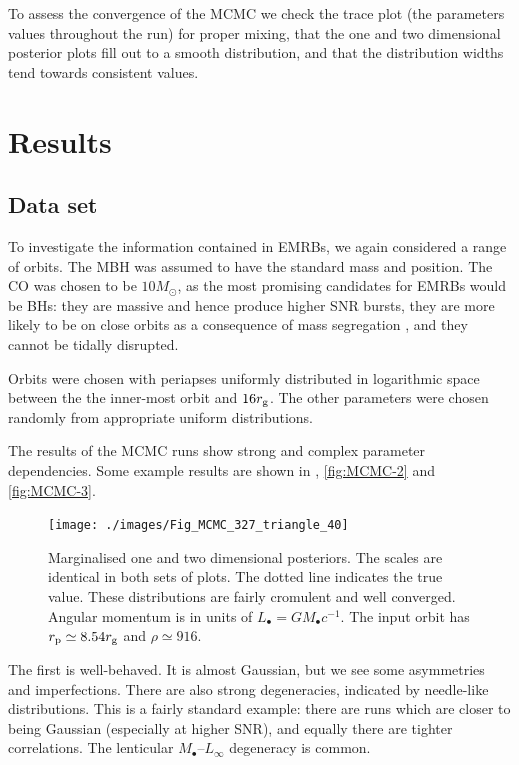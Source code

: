 To assess the convergence of the MCMC we check the trace plot (the parameters values throughout the run) for proper mixing, that the one and two dimensional posterior plots fill out to a smooth distribution, and that the distribution widths tend towards consistent values.

\section{Results}\label{sec:Results}

\subsection{Data set}

To investigate the information contained in EMRBs, we again considered a range of orbits. The MBH was assumed to have the standard mass and position. The CO was chosen to be $10 M_\odot$, as the most promising candidates for EMRBs would be BHs: they are massive and hence produce higher SNR bursts, they are more likely to be on close orbits as a consequence of mass segregation \citep{Bahcall1977, Alexander2009}, and they cannot be tidally disrupted.

Orbits were chosen with periapses uniformly distributed in logarithmic space between the the inner-most orbit and $16 r_\mathrm{g}$. The other parameters were chosen randomly from appropriate uniform distributions. 

The results of the MCMC runs show strong and complex parameter dependencies. Some example results are shown in , \ref{fig:MCMC-2} and \ref{fig:MCMC-3}.
\begin{figure}[!htp]
\begin{center}
   \texttt{[image: ./images/Fig\_MCMC\_327\_triangle\_40]}
\caption{Marginalised one and two dimensional posteriors. The scales are identical in both sets of plots. The dotted line indicates the true value. These distributions are fairly cromulent and well converged. Angular momentum is in units of $L_\bullet = GM_\bullet c^{-1}$. The input orbit has $r_\mathrm{p} \simeq 8.54 r_\mathrm{g}$ and $\rho \simeq 916$.\label{fig:MCMC-1}}
\end{center}
\end{figure}

The first is well-behaved. It is almost Gaussian, but we see some asymmetries and imperfections. There are also strong degeneracies, indicated by needle-like distributions. This is a fairly standard example: there are runs which are closer to being Gaussian (especially at higher SNR), and equally there are tighter correlations. The lenticular $M_\bullet$--$L_\infty$ degeneracy is common.

